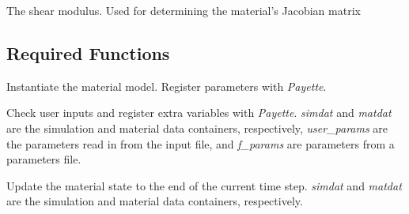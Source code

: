 \documentclass[letterpaper,10pt,english]{sphinxmanual}
\begin{document}

\begin{fulllineitems}
\label{Files/installing_materials:MaterialModel.shear_modulus}
The shear modulus.  Used for determining the material's Jacobian matrix

\end{fulllineitems}



\subsection{Required Functions}
\label{Files/installing_materials:required-functions}

\begin{fulllineitems}
\label{Files/installing_materials:MaterialModel.__init__}
Instantiate the material model.  Register parameters with \emph{Payette}.

\end{fulllineitems}


\begin{fulllineitems}
\label{Files/installing_materials:MaterialModel.setUp}
Check user inputs and register extra variables with \emph{Payette}. \emph{simdat} and
\emph{matdat} are the simulation and material data containers, respectively,
\emph{user\_params} are the parameters read in from the input file, and \emph{f\_params}
are parameters from a parameters file.

\end{fulllineitems}


\begin{fulllineitems}
\label{Files/installing_materials:MaterialModel.updateState}
Update the material state to the end of the current time step. \emph{simdat} and
\emph{matdat} are the simulation and material data containers, respectively.

\end{fulllineitems}
\end{document}
